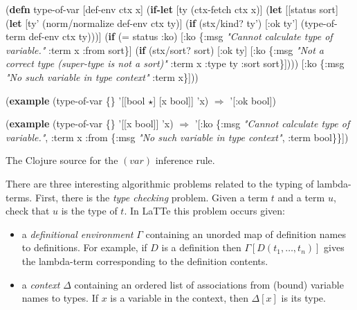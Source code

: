 \documentclass{styles/sig-alternate-05-2015}
\newcommand{\typeterm}{\star}
\newcommand{\kw}[1]{\textbf{#1}}
\newcommand{\cmt}[1]{\textit{#1}}
\begin{document}
\begin{table*}[ht]
\begin{program}
(\kw{defn} type-of-var [def-env ctx x]
  (\kw{if-let} [ty (ctx-fetch ctx x)] 
    (\kw{let} [[status sort] (\kw{let} [ty' (norm/normalize def-env ctx ty)] 
                          (\kw{if} (stx/kind? ty') 
                            [:ok ty'] 
                            (type-of-term def-env ctx ty)))] 
      (\kw{if} (= status :ko) 
        [:ko \{:msg \cmt{"Cannot calculate type of variable."} :term x :from sort\}]
        (\kw{if} (stx/sort? sort) 
           [:ok ty] 
           [:ko \{:msg \cmt{"Not a correct type (super-type is not a sort)"} :term x :type ty :sort sort\}]))) 
    [:ko \{:msg \cmt{"No such variable in type context"} :term x\}]))


(\kw{example}
 (type-of-var \{\} '[[bool $\typeterm$] [x bool]] 'x) $\Rightarrow$ '[:ok bool])

(\kw{example}
 (type-of-var \{\} '[[x bool]] 'x)
 $\Rightarrow$ '[:ko \{:msg \cmt{"Cannot calculate type of variable."},
           :term x :from \{:msg \cmt{"No such variable in type context"}, :term bool\}\}])
\end{program}

\caption{\label{tab:varrule}The Clojure source for the $(var)$ inference rule.}
\end{table*}

There are three interesting algorithmic problems related to the typing of lambda-terms. First, there is the \emph{type checking} problem. Given a term $t$ and a term $u$, check that $u$ is the type of $t$. In LaTTe this problem occurs given:
\begin{itemize}
\item a \emph{definitional environment} $\Gamma$ containing an unorded map of definition names to definitions. For example, if $D$ is a definition then $\Gamma[D(t_1,\ldots,t_n)]$ gives the lambda-term corresponding to the definition contents.
\item a \emph{context} $\Delta$ containing an ordered list of associations from (bound) variable names to types. If $x$ is a variable in the context, then $\Delta[x]$ is its type.
\end{itemize}
\end{document}
